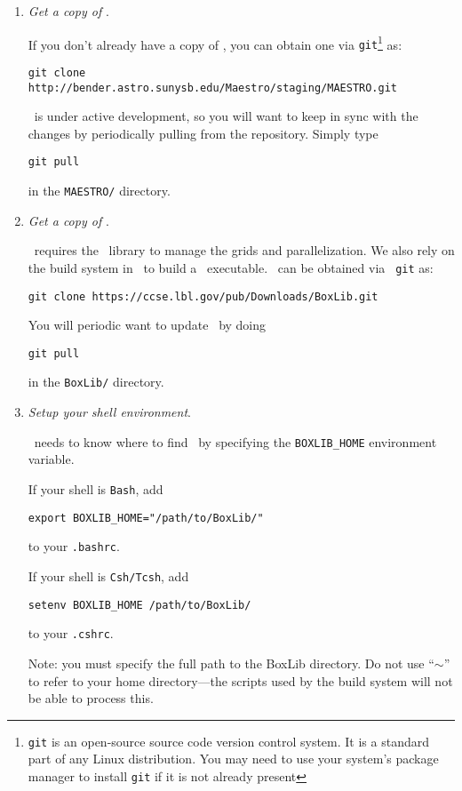 \begin{enumerate}

\item {\em Get a copy of \maestro}.

If you don't already have a copy of \maestro, you can obtain one
via {\tt git}\footnote{{\tt git} is an open-source source code version control
system.  It is a standard part of any Linux distribution.  You may
need to use your system's package manager to install {\tt git} if it
is not already present} as:
\begin{verbatim}
git clone http://bender.astro.sunysb.edu/Maestro/staging/MAESTRO.git
\end{verbatim}
\maestro\ is under active development, so you will want to keep in 
sync with the changes by periodically pulling from the repository.  Simply
type
\begin{verbatim}
git pull
\end{verbatim}
in the {\tt MAESTRO/} directory.

\item {\em Get a copy of \boxlib}.

\maestro\ requires the \boxlib\ library to manage the grids and 
parallelization.  We also rely on the build system in \boxlib\ to
build a \maestro\ executable.  \boxlib\ can be obtained via {\tt
git} as:
\begin{verbatim}
git clone https://ccse.lbl.gov/pub/Downloads/BoxLib.git
\end{verbatim}

You will periodic want to update \boxlib\ by doing
\begin{verbatim}
git pull
\end{verbatim}
in the {\tt BoxLib/} directory.


\item {\em Setup your shell environment}.

\maestro\ needs to know where to find \boxlib\, by specifying the 
{\tt BOXLIB\_HOME} environment variable.  

If your shell is {\tt Bash}, add
\begin{verbatim}
export BOXLIB_HOME="/path/to/BoxLib/"
\end{verbatim}
to your {\tt .bashrc}. 

If your shell is {\tt Csh/Tcsh}, add
\begin{verbatim}
setenv BOXLIB_HOME /path/to/BoxLib/
\end{verbatim}
to your {\tt .cshrc}.  

Note: you must specify the full path to the BoxLib directory.  Do not
use ``$\sim$'' to refer to your home directory---the scripts used by
the build system will not be able to process this.


\end{enumerate}
